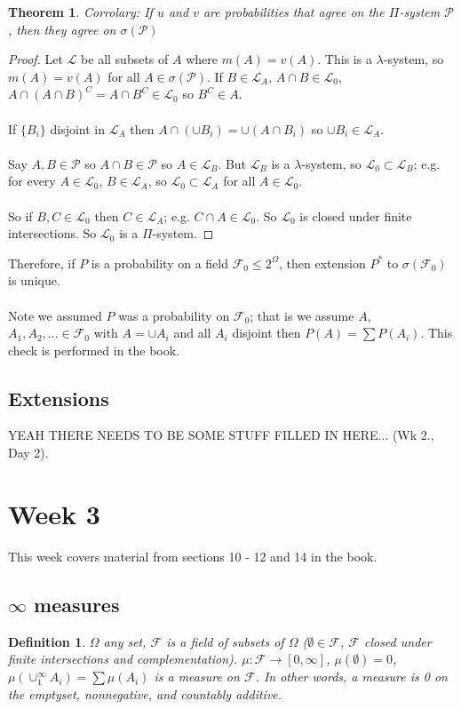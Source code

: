 \documentclass[12pt]{article}
\newtheorem{theorem}{Theorem}
\newtheorem{defn}{Definition}
\begin{document}
\begin{theorem}
Corrolary: If $u$ and $v$ are probabilities that agree on the $\Pi$-system $\mathcal{P}$, then they agree on $\sigma(\mathcal{P})$
\end{theorem}
\begin{proof}
Let $\mathcal{L}$ be all subsets of $A$ where $m(A) = v(A)$.  This is a $\lambda$-system, so $m(A) = v(A)$ for all $A \in \sigma(\mathcal{P})$.  If $B \in \mathcal{L}_A$, $A \cap B \in \mathcal{L}_0$, $A \cap (A \cap B)^C = A \cap B^C \in \mathcal{L}_0$ so $B^C \in A$.
\\ \\
If $\{B_i\}$ disjoint in $\mathcal{L}_A$ then $A \cap (\cup B_i) = \cup(A \cap B_i)$ so $\cup B_i \in \mathcal{L}_A$.
\\ \\
Say $A, B \in \mathcal{P}$ so $A \cap B \in \mathcal{P}$ so $A \in \mathcal{L}_B$.  But $\mathcal{L}_B$ is a $\lambda$-system, so $\mathcal{L}_0 \subset \mathcal{L}_B$; e.g. for every $A \in \mathcal{L}_0$, $B \in \mathcal{L}_A$, so $\mathcal{L}_0 \subset \mathcal{L}_A$ for all $A \in \mathcal{L}_0$.
\\ \\
So if $B, C \in \mathcal{L}_0$ then $C \in \mathcal{L}_A$; e.g. $C \cap A \in \mathcal{L}_0$.  So $\mathcal{L}_0$ is closed under finite intersections.  So $\mathcal{L}_0$ is a $\Pi$-system.
\end{proof}

Therefore, if $P$ is a probability on a field $\mathcal{F}_0 \le 2^\Omega$, then extension $P^*$ to $\sigma( \mathcal{F}_0)$ is unique.
\\ \\
Note we assumed $P$ was a probability on $\mathcal{F}_0$; that is we assume $A$, $A_1, A_2, ...\in \mathcal{F}_0$ with $A = \cup A_i$ and all $A_i$ disjoint then $P(A) = \sum P(A_i)$.  This check is performed in the book.

\subsection{Extensions}
YEAH THERE NEEDS TO BE SOME STUFF FILLED IN HERE... (Wk 2., Day 2).

\section{Week 3}
This week covers material from sections 10 - 12 and 14 in the book.

\subsection{$\infty$ measures}
\begin{defn}
$\Omega$ any set, $\mathcal{F}$ is a field of subsets of $\Omega$ ($\emptyset \in \mathcal{F}$, $\mathcal{F}$ closed under finite intersections and complementation).  $\mu: \mathcal{F} \rightarrow [0, \infty]$, $\mu(\emptyset) = 0$, $\mu(\cup_1^\infty A_i) = \sum \mu(A_i)$ is a measure on $\mathcal{F}$.  In other words, a measure is 0 on the emptyset, nonnegative, and countably additive.
\end{defn}
\end{document}
